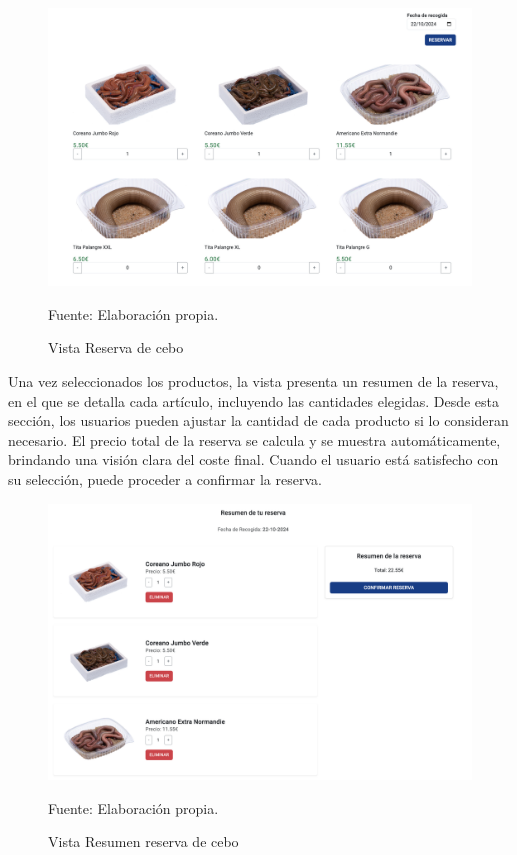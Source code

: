 \begin{figure}[H]
\begin{center}
\includegraphics[scale=0.5]{./Images/vistaReservaCebo.png}
\caption{Vista Reserva de cebo} Fuente: Elaboración propia.

\label{fig:fig1}

\end{center}
\end{figure}

Una vez seleccionados los productos, la vista presenta un resumen de la reserva, en el que se detalla cada artículo, incluyendo las cantidades elegidas. Desde esta sección, los usuarios pueden ajustar la cantidad de cada producto si lo consideran necesario. El precio total de la reserva se calcula y se muestra automáticamente, brindando una visión clara del coste final. Cuando el usuario está satisfecho con su selección, puede proceder a confirmar la reserva.

\begin{figure}[H]
\begin{center}
\includegraphics[scale=0.5]{./Images/vistaResumenReservaCebo.png}
\caption{Vista Resumen reserva de cebo} Fuente: Elaboración propia.

\label{fig:fig1}

\end{center}
\end{figure}

